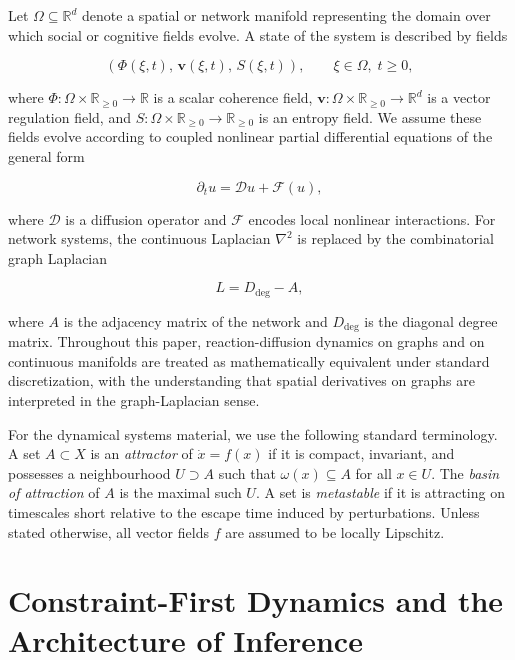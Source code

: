 \documentclass[12pt,a4paper]{article}
\theoremstyle{plain}
\theoremstyle{definition}
\begin{document}
Let $\Omega \subseteq \mathbb{R}^d$ denote a spatial or network manifold representing the domain over which social or cognitive fields evolve. A state of the system is described by fields

\begin{equation}
(\Phi(\xi,t),\,\mathbf{v}(\xi,t),\,S(\xi,t)), \qquad \xi \in \Omega,\; t \geq 0,
\end{equation}

where $\Phi : \Omega \times \mathbb{R}_{\geq 0} \to \mathbb{R}$ is a scalar coherence field, $\mathbf{v} : \Omega \times \mathbb{R}_{\geq 0} \to \mathbb{R}^d$ is a vector regulation field, and $S : \Omega \times \mathbb{R}_{\geq 0} \to \mathbb{R}_{\geq 0}$ is an entropy field. We assume these fields evolve according to coupled nonlinear partial differential equations of the general form

\begin{equation}
\partial_t u = \mathcal{D}u + \mathcal{F}(u),
\end{equation}

where $\mathcal{D}$ is a diffusion operator and $\mathcal{F}$ encodes local nonlinear interactions. For network systems, the continuous Laplacian $\nabla^2$ is replaced by the combinatorial graph Laplacian

\begin{equation}
L = D_{\deg} - A,
\end{equation}

where $A$ is the adjacency matrix of the network and $D_{\deg}$ is the diagonal degree matrix. Throughout this paper, reaction-diffusion dynamics on graphs and on continuous manifolds are treated as mathematically equivalent under standard discretization, with the understanding that spatial derivatives on graphs are interpreted in the graph-Laplacian sense.

For the dynamical systems material, we use the following standard terminology. A set $A \subset X$ is an \emph{attractor} of $\dot{x} = f(x)$ if it is compact, invariant, and possesses a neighbourhood $U \supset A$ such that $\omega(x) \subseteq A$ for all $x \in U$. The \emph{basin of attraction} of $A$ is the maximal such $U$. A set is \emph{metastable} if it is attracting on timescales short relative to the escape time induced by perturbations. Unless stated otherwise, all vector fields $f$ are assumed to be locally Lipschitz.

\section{Constraint-First Dynamics and the Architecture of Inference}
\label{sec:constraint}
\end{document}
